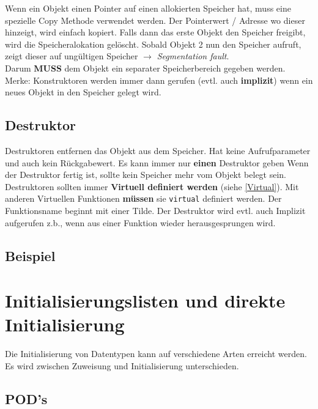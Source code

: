 Wenn ein Objekt einen Pointer auf einen allokierten Speicher hat, muss eine spezielle Copy Methode verwendet werden. 
Der Pointerwert / Adresse wo dieser hinzeigt, wird einfach kopiert. 
Falls dann das erste Objekt den Speicher freigibt, wird die Speicheralokation gelöscht. 
Sobald Objekt 2 nun den Speicher aufruft, zeigt dieser auf ungültigen Speicher $\rightarrow$ \textit{Segmentation fault}.\\
Darum \textbf{MUSS} dem Objekt ein separater Speicherbereich gegeben werden.\\

Merke: Konstruktoren werden immer dann gerufen (evtl. auch \textbf{implizit}) wenn ein neues Objekt in den Speicher gelegt wird.\\

\subsection{Destruktor}

Destruktoren entfernen das Objekt aus dem Speicher. 
Hat keine Aufrufparameter und auch kein Rückgabewert. 
Es kann immer nur \textbf{einen} Destruktor geben
Wenn der Destruktor fertig ist, sollte kein Speicher mehr vom Objekt belegt sein.\\
Destruktoren sollten immer \textbf{Virtuell definiert werden} (siehe \ref{Virtual}). 
Mit anderen Virtuellen Funktionen \textbf{müssen} sie \verb|virtual| definiert werden. 
Der Funktionsname beginnt mit einer Tilde. 
Der Destruktor wird evtl. auch Implizit aufgerufen z.b., wenn aus einer Funktion wieder herausgesprungen wird. 

\subsection{Beispiel}



\section{Initialisierungslisten und direkte Initialisierung}

Die Initialisierung von Datentypen kann auf verschiedene Arten erreicht werden. 
Es wird zwischen Zuweisung und Initialisierung unterschieden.

\subsection{POD's}

